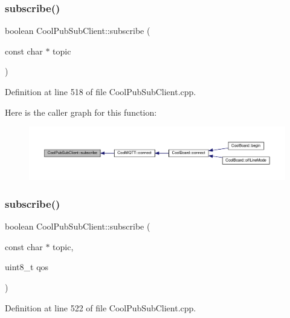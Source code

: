 \subsubsection{\texorpdfstring{subscribe()}{subscribe()}\hspace{0.1cm}{\footnotesize\ttfamily [1/2]}}
{\footnotesize\ttfamily boolean Cool\+Pub\+Sub\+Client\+::subscribe (\begin{DoxyParamCaption}\item[{const char $\ast$}]{topic }\end{DoxyParamCaption})}



Definition at line 518 of file Cool\+Pub\+Sub\+Client.\+cpp.

Here is the caller graph for this function\+:\nopagebreak
\begin{figure}[H]
\begin{center}
\leavevmode
\includegraphics[width=350pt]{class_cool_pub_sub_client_ac1ebc9ad874128aefa985d78496d2e8f_icgraph}
\end{center}
\end{figure}
\mbox{\label{class_cool_pub_sub_client_aebf684e98588c52a72af1014f7957bee}} 
\subsubsection{\texorpdfstring{subscribe()}{subscribe()}\hspace{0.1cm}{\footnotesize\ttfamily [2/2]}}
{\footnotesize\ttfamily boolean Cool\+Pub\+Sub\+Client\+::subscribe (\begin{DoxyParamCaption}\item[{const char $\ast$}]{topic,  }\item[{uint8\+\_\+t}]{qos }\end{DoxyParamCaption})}



Definition at line 522 of file Cool\+Pub\+Sub\+Client.\+cpp.

